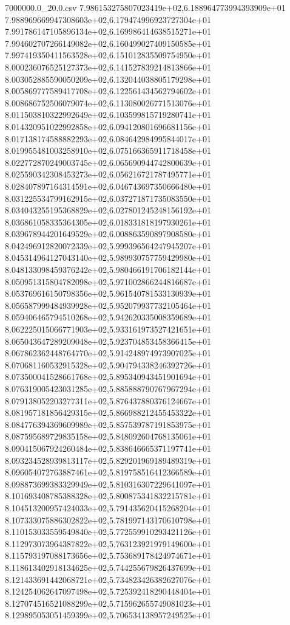 \begin{filecontents*}{7000000.0_20.0.csv}
7.986153275807023419e+02,6.188964773994393909e+01
7.988969669947308603e+02,6.179474996923727304e+01
7.991786147105896134e+02,6.169986414638515271e+01
7.994602707266149082e+02,6.160499027409150585e+01
7.997419350411563528e+02,6.151012835509754950e+01
8.000236076525127373e+02,6.141527839214813866e+01
8.003052885590050209e+02,6.132044038805179298e+01
8.005869777589417708e+02,6.122561434562794602e+01
8.008686752506079074e+02,6.113080026771513076e+01
8.011503810322992649e+02,6.103599815719280741e+01
8.014320951022992858e+02,6.094120801696681156e+01
8.017138174588882293e+02,6.084642984995844017e+01
8.019955481003258910e+02,6.075166365911718458e+01
8.022772870249003745e+02,6.065690944742800639e+01
8.025590342308453273e+02,6.056216721787495771e+01
8.028407897164314591e+02,6.046743697350666480e+01
8.031225534799162915e+02,6.037271871735083550e+01
8.034043255195368829e+02,6.027801245248156192e+01
8.036861058335364305e+02,6.018331818197930261e+01
8.039678944201649529e+02,6.008863590897908580e+01
8.042496912820072339e+02,5.999396564247945207e+01
8.045314964127043140e+02,5.989930757759429980e+01
8.048133098459376242e+02,5.980466191706182144e+01
8.050951315804782098e+02,5.971002866244816687e+01
8.053769616150798356e+02,5.961540781533130939e+01
8.056587999484939928e+02,5.952079937732105464e+01
8.059406465794510268e+02,5.942620335008359689e+01
8.062225015066771903e+02,5.933161973527421651e+01
8.065043647289209048e+02,5.923704853458366415e+01
8.067862362448764770e+02,5.914248974973907025e+01
8.070681160532915328e+02,5.904794338246392726e+01
8.073500041528661768e+02,5.895340943451901694e+01
8.076319005423031285e+02,5.885888790767967294e+01
8.079138052203277311e+02,5.876437880376124667e+01
8.081957181856429315e+02,5.866988212455453322e+01
8.084776394369609989e+02,5.857539787191853975e+01
8.087595689729835158e+02,5.848092604768135061e+01
8.090415067924260484e+02,5.838646665371197741e+01
8.093234528939813117e+02,5.829201969189489319e+01
8.096054072763887461e+02,5.819758516412366589e+01
8.098873699383329949e+02,5.810316307229641097e+01
8.101693408785388328e+02,5.800875341832215781e+01
8.104513200957424033e+02,5.791435620415268204e+01
8.107333075886302822e+02,5.781997143170610798e+01
8.110153033559549840e+02,5.772559910293421126e+01
8.112973073964387822e+02,5.763123921979149600e+01
8.115793197088173656e+02,5.753689178424974671e+01
8.118613402918134625e+02,5.744255679826437699e+01
8.121433691442068721e+02,5.734823426382627076e+01
8.124254062647097498e+02,5.725392418290448404e+01
8.127074516521088299e+02,5.715962655749081023e+01
8.129895053051459399e+02,5.706534138957249525e+01

\end{filecontents*}

